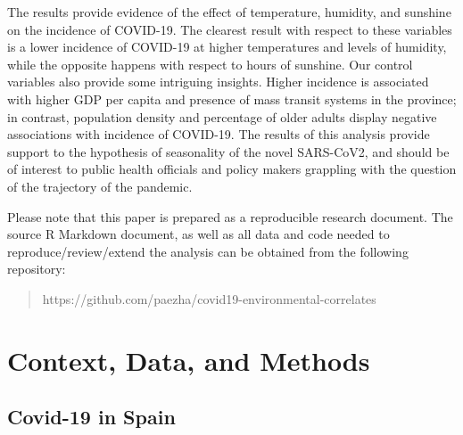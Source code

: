 \documentclass[]{elsarticle} %
\begin{document}
The results provide evidence of the effect of temperature, humidity, and
sunshine on the incidence of COVID-19. The clearest result with respect
to these variables is a lower incidence of COVID-19 at higher
temperatures and levels of humidity, while the opposite happens with
respect to hours of sunshine. Our control variables also provide some
intriguing insights. Higher incidence is associated with higher GDP per
capita and presence of mass transit systems in the province; in
contrast, population density and percentage of older adults display
negative associations with incidence of COVID-19. The results of this
analysis provide support to the hypothesis of seasonality of the novel
SARS-CoV2, and should be of interest to public health officials and
policy makers grappling with the question of the trajectory of the
pandemic.

Please note that this paper is prepared as a reproducible research
document. The source R Markdown document, as well as all data and code
needed to reproduce/review/extend the analysis can be obtained from the
following repository:

\begin{quote}
https://github.com/paezha/covid19-environmental-correlates
\end{quote}

\hypertarget{context-data-and-methods}{%
\section{Context, Data, and Methods}\label{context-data-and-methods}}

\hypertarget{covid-19-in-spain}{%
\subsection{Covid-19 in Spain}\label{covid-19-in-spain}}
\end{document}
